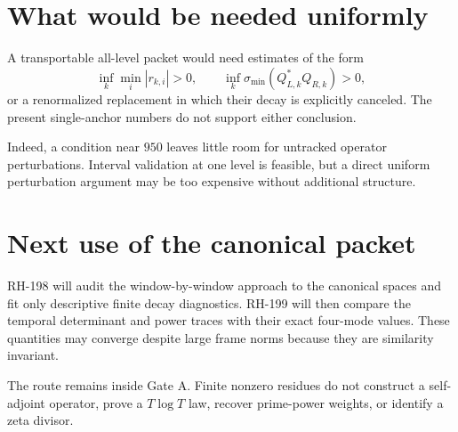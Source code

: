 \documentclass[12pt]{article}
\theoremstyle{remark}
\begin{document}
\section{What would be needed uniformly}

A transportable all-level packet would need estimates of the form
\begin{equation}\label{eq:uniform-needs}
 \inf_k\min_i|r_{k,i}|>0,
 \qquad
 \inf_k\sigma_{\min}(Q_{L,k}^*Q_{R,k})>0,
\end{equation}
or a renormalized replacement in which their decay is explicitly canceled.
The present single-anchor numbers do not support either conclusion.

Indeed, a condition near $950$ leaves little room for untracked operator
perturbations.  Interval validation at one level is feasible, but a direct
uniform perturbation argument may be too expensive without additional
structure.

\section{Next use of the canonical packet}

RH-198 will audit the window-by-window approach to the canonical spaces and
fit only descriptive finite decay diagnostics.  RH-199 will then compare the
temporal determinant and power traces with their exact four-mode values.
These quantities may converge despite large frame norms because they are
similarity invariant.

The route remains inside Gate A.  Finite nonzero residues do not construct a
self-adjoint operator, prove a $T\log T$ law, recover prime-power weights, or
identify a zeta divisor.



\end{document}
